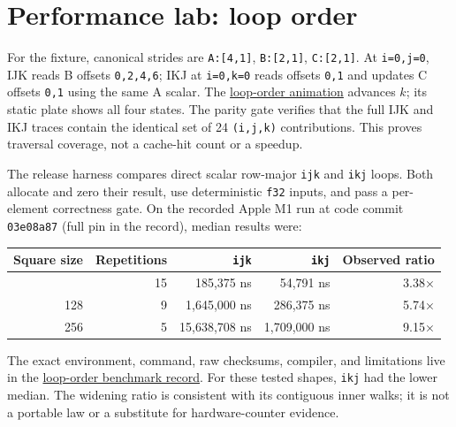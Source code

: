 \section{Performance lab: loop
order}\label{performance-lab-loop-order}


For the fixture, canonical strides are \texttt{A:{[}4,1{]}},
\texttt{B:{[}2,1{]}}, \texttt{C:{[}2,1{]}}. At \texttt{i=0,j=0}, IJK
reads B offsets \texttt{0,2,4,6}; IKJ at \texttt{i=0,k=0} reads offsets
\texttt{0,1} and updates C offsets \texttt{0,1} using the same A scalar.
The
\href{https://github.com/hermonai/inside-the-llm-engine/blob/astra-visual-rewrite/figures/generated/ch06-loops.html}{loop-order
animation} advances \(k\); its static plate shows all four states. The
parity gate verifies that the full IJK and IKJ traces contain the
identical set of 24 \texttt{(i,j,k)} contributions. This proves
traversal coverage, not a cache-hit count or a speedup.

The release harness compares direct scalar row-major \texttt{ijk} and
\texttt{ikj} loops. Both allocate and zero their result, use
deterministic \texttt{f32} inputs, and pass a per-element correctness
gate. On the recorded Apple M1 run at code commit \texttt{03e08a87}
(full pin in the record), median results were:

{\def\LTcaptype{none} %
\begin{longtable}[]{@{}rrrrr@{}}
\toprule\noalign{}
Square size & Repetitions & \texttt{ijk} & \texttt{ikj} & Observed
ratio \\
\midrule\noalign{}
\endhead
\bottomrule\noalign{}
\endlastfoot
64 & 15 & 185,375 ns & 54,791 ns & 3.38× \\
128 & 9 & 1,645,000 ns & 286,375 ns & 5.74× \\
256 & 5 & 15,638,708 ns & 1,709,000 ns & 9.15× \\
\end{longtable}
}

The exact environment, command, raw checksums, compiler, and limitations
live in the
\href{https://github.com/hermonai/inside-the-llm-engine/blob/astra-visual-rewrite/research/benchmarks/chapter-06-loop-order.md}{loop-order
benchmark record}. For these tested shapes, \texttt{ikj} had the lower
median. The widening ratio is consistent with its contiguous inner
walks; it is not a portable law or a substitute for hardware-counter
evidence.


